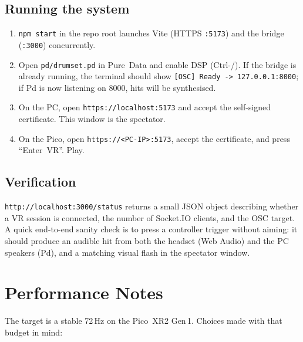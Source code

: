 \documentclass[11pt,a4paper]{article}
\begin{document}
\subsection{Running the system}

\begin{enumerate}[leftmargin=2em]
    \item \texttt{npm start} in the repo root launches Vite (HTTPS
          \texttt{:5173}) and the bridge (\texttt{:3000}) concurrently.
    \item Open \texttt{pd/drumset.pd} in Pure~Data and enable DSP
          (Ctrl-/). If the bridge is already running, the terminal
          should show \texttt{[OSC] Ready -> 127.0.0.1:8000}; if Pd is
          now listening on 8000, hits will be synthesised.
    \item On the PC, open \texttt{https://localhost:5173} and accept
          the self-signed certificate. This window is the spectator.
    \item On the Pico, open \texttt{https://<PC-IP>:5173}, accept the
          certificate, and press ``Enter~VR''. Play.
\end{enumerate}

\subsection{Verification}

\texttt{http://localhost:3000/status} returns a small JSON object
describing whether a VR session is connected, the number of
Socket.IO clients, and the OSC target. A quick end-to-end sanity check
is to press a controller trigger without aiming: it should produce
an audible hit from both the headset (Web Audio) and the PC
speakers (Pd), and a matching visual flash in the spectator window.

\section{Performance Notes}

The target is a stable 72\,Hz on the Pico~XR2 Gen\,1. Choices made
with that budget in mind:
\end{document}
